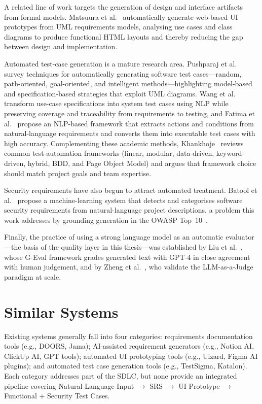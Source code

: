 \documentclass[12pt,a4paper,oneside]{report}
\begin{document}
A related line of work targets the generation of design and interface artifacts from formal models. Matsuura et al.~\cite{ref1} automatically generate web-based UI prototypes from UML requirements models, analysing use cases and class diagrams to produce functional HTML layouts and thereby reducing the gap between design and implementation.

Automated test-case generation is a mature research area. Pushparaj et al.~\cite{ref4} survey techniques for automatically generating software test cases---random, path-oriented, goal-oriented, and intelligent methods---highlighting model-based and specification-based strategies that exploit UML diagrams. Wang et al.~\cite{ref6} transform use-case specifications into system test cases using NLP while preserving coverage and traceability from requirements to testing, and Fatima et al.~\cite{ref5} propose an NLP-based framework that extracts actions and conditions from natural-language requirements and converts them into executable test cases with high accuracy. Complementing these academic methods, Khankhoje~\cite{ref2} reviews common test-automation frameworks (linear, modular, data-driven, keyword-driven, hybrid, BDD, and Page Object Model) and argues that framework choice should match project goals and team expertise.

Security requirements have also begun to attract automated treatment. Batool et al.~\cite{ref7} propose a machine-learning system that detects and categorises software security requirements from natural-language project descriptions, a problem this work addresses by grounding generation in the OWASP Top~10~\cite{ref11}.

Finally, the practice of using a strong language model as an automatic evaluator---the basis of the quality layer in this thesis---was established by Liu et al.~\cite{ref16}, whose G-Eval framework grades generated text with GPT-4 in close agreement with human judgement, and by Zheng et al.~\cite{ref17}, who validate the LLM-as-a-Judge paradigm at scale.

\section{Similar Systems}
Existing systems generally fall into four categories: requirements documentation tools (e.g., DOORS, Jama); AI-assisted requirement generators (e.g., Notion AI, ClickUp AI, GPT tools); automated UI prototyping tools (e.g., Uizard, Figma AI plugins); and automated test case generation tools (e.g., TestSigma, Katalon). Each category addresses part of the SDLC, but none provide an integrated pipeline covering Natural Language Input $\rightarrow$ SRS $\rightarrow$ UI Prototype $\rightarrow$ Functional + Security Test Cases.
\end{document}
